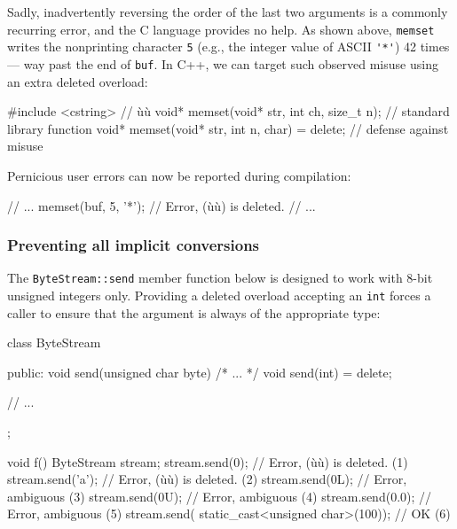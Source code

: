 \noindent Sadly, inadvertently reversing the order of the last two arguments is a commonly
recurring error, and the C language provides no help. As shown above, \lstinline!memset! writes the nonprinting character \lstinline!5! (e.g., the integer value of ASCII \lstinline!'*'!) 42 times --- way past the end of \lstinline!buf!. In C++, we
can target such observed misuse using an extra deleted overload:

\begin{emcppslisting}
#include <cstring>  // ù{}ù
void* memset(void* str, int ch, size_t n);      // standard library function
void* memset(void* str, int n, char) = delete;  // defense against misuse
\end{emcppslisting}

\noindent Pernicious user errors can now be reported during compilation:

\begin{emcppslisting}
// ...
memset(buf, 5, '*');  // Error, (ù{}ù) is deleted.
// ...
\end{emcppslisting}


\subsubsection[Preventing all implicit conversions]{Preventing all implicit conversions}\label{preventing-all-implicit-conversions}

The \lstinline!ByteStream::send! member function below is designed to work
with 8-bit unsigned integers only. Providing a deleted overload
accepting an \lstinline!int! forces a caller to ensure that the argument is
always of the appropriate type:

\begin{emcppslisting}
class ByteStream
{
public:
    void send(unsigned char byte) { /* ... */ }
    void send(int) = delete;

    // ...
};

void f()
{
    ByteStream stream;
    stream.send(0);   // Error, (ù{}ù) is deleted.     (1)
    stream.send('a'); // Error, (ù{}ù) is deleted.     (2)
    stream.send(0L);  // Error, ambiguous                 (3)
    stream.send(0U);  // Error, ambiguous                 (4)
    stream.send(0.0); // Error, ambiguous                 (5)
    stream.send(
        static_cast<unsigned char>(100));  // OK          (6)
}
\end{emcppslisting}

